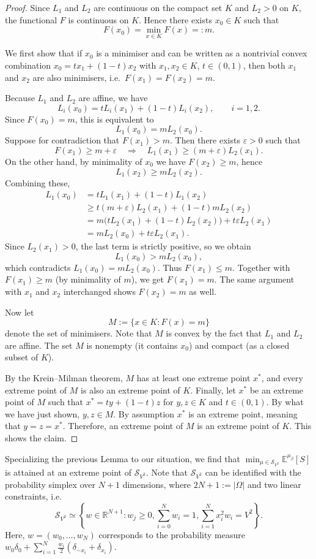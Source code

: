 \documentclass[reqno,11pt]{amsart}
\newcommand{\1}{\mathds{1}}
\theoremstyle{plain}
\theoremstyle{definition}
\numberwithin{equation}{section}
\newcommand{\caS}{{\mathcal S}}
\newcommand{\bbE}{{\mathbb E}}
\newcommand{\bbR}{{\mathbb R}}
\def\lt{\left}
\def\rt{\right}
\begin{document}
\begin{proof}
Since $L_1$ and $L_2$ are continuous on the compact set $K$ and $L_2>0$ on $K$,
the functional $F$ is continuous on $K$. Hence there exists $x_0\in K$ such that
\[
    F(x_0) = \min_{x\in K} F(x) =: m.
\]

We first show that if $x_0$ is a minimiser and can be written as a nontrivial
convex combination $x_0 = t x_1 + (1-t)x_2$ with $x_1,x_2\in K$, $t\in(0,1)$,
then both $x_1$ and $x_2$ are also minimisers, i.e.\ $F(x_1)=F(x_2)=m$.

Because $L_1$ and $L_2$ are affine, we have
\[
    L_i(x_0)
    = t L_i(x_1) + (1-t)L_i(x_2),\qquad i=1,2.
\]
Since $F(x_0)=m$, this is equivalent to
\[
    L_1(x_0) = m L_2(x_0).
\]
Suppose for contradiction that $F(x_1)>m$. Then there exists $\varepsilon>0$
such that
\[
    F(x_1) \ge m + \varepsilon
    \quad\Longrightarrow\quad
    L_1(x_1) \ge (m+\varepsilon) L_2(x_1).
\]
On the other hand, by minimality of $x_0$ we have $F(x_2)\ge m$, hence
\[
    L_1(x_2) \ge m L_2(x_2).
\]
Combining these,
\begin{align*}
    L_1(x_0)
    &= t L_1(x_1) + (1-t)L_1(x_2)
    \\
    &\ge t (m+\varepsilon)L_2(x_1) + (1-t) m L_2(x_2)
    \\
    &= m\bigl(t L_2(x_1)+(1-t)L_2(x_2)\bigr)
       + t\varepsilon L_2(x_1)
    \\
    &= m L_2(x_0) + t\varepsilon L_2(x_1).
\end{align*}
Since $L_2(x_1)>0$, the last term is strictly positive, so we obtain
\[
    L_1(x_0) > m L_2(x_0),
\]
which contradicts $L_1(x_0) = m L_2(x_0)$. Thus $F(x_1)\le m$. Together with
$F(x_1)\ge m$ (by minimality of $m$), we get $F(x_1)=m$. The same argument with
$x_1$ and $x_2$ interchanged shows $F(x_2)=m$ as well.

Now let
\[
    M := \{x\in K : F(x)=m\}
\]
denote the set of minimisers. Note that $M$ is convex by the fact that $L_1$ and $L_2$ are affine. The set $M$ is nonempty (it contains
$x_0$) and compact (as a closed subset of $K$).

By the Krein--Milman theorem, $M$ has at least one extreme point $x^\ast$,
and every extreme point of $M$ is also an extreme point of $K$. 
Finally, let $x^*$ be an extreme point of $M$ such that
$x^* = t y + (1-t) z$ for $y,z \in K$ and $t \in (0,1)$. By what we have just shown, $y,z \in M$. By assumption $x^*$ is an extreme point, meaning that $y = z = x^*$. Therefore, an extreme point of $M$ is an extreme point of $K$. This shows the claim.
\end{proof}
Specializing the previous Lemma to our situation, we find that
$\min_{\mu \in \caS_{V^2}} \bbE^{\mu_\beta}[S]$
is attained at an extreme point of $\caS_{V^2}$. Note that $\caS_{V^2}$ can be identified with the probability simplex over $N+1$ dimensions, where $2N +1 := |\Omega|$ and two linear constraints, i.e.
$$\caS_{V^2} \simeq \lt\{ w \in \bbR^{N+1}: w_j \ge0, \sum\limits_{i=0} ^{N} w_i = 1, \sum\limits_{i=1} ^N x_i ^2 w_i = V^2 \rt\}.$$
Here, $w = (w_0,\dots,w_N)$ corresponds to the probability measure
$w_0 \delta_0 + \sum\limits_{i=1} ^N \frac {w_i} 2 (\delta_{-x_i} + \delta_{x_i}).$
\end{document}
